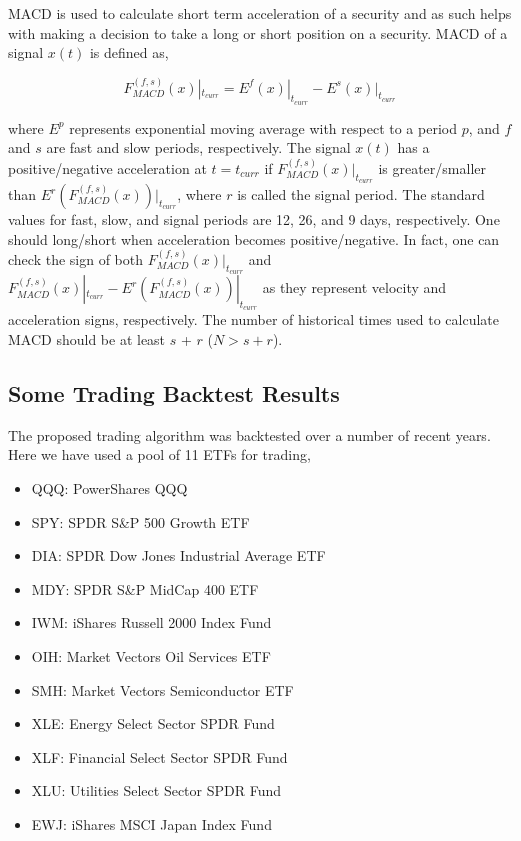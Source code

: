\documentclass{article}
\begin{document}
MACD is used to calculate short term acceleration of a security and as
such helps with making a decision to take a long or short position on
a security. MACD of a signal $x(t)$ is defined as,

\begin{equation}\label{eqn:macd}
F_{MACD}^{(f,s)}(x)|_{t_{curr}} = E^{f}(x)|_{t_{curr}} -
E^{s}(x)|_{t_{curr}}
\end{equation}

where $E^{p}$ represents exponential moving average with respect to a
period $p$, and $f$ and $s$ are fast and slow periods,
respectively. The signal $x(t)$ has a positive/negative acceleration
at $t=t_{curr}$ if $F_{MACD}^{(f,s)}(x)|_{t_{curr}}$ is
greater/smaller than $E^{r}(F_{MACD}^{(f,s)}(x))|_{t_{curr}}$, where
$r$ is called the signal period. The standard values for fast, slow,
and signal periods are 12, 26, and 9 days, respectively. One should
long/short when acceleration becomes positive/negative. In fact, one
can check the sign of both $F_{MACD}^{(f,s)}(x)|_{t_{curr}}$ and
$F_{MACD}^{(f,s)}(x)|_{t_{curr}}-E^{r}(F_{MACD}^{(f,s)}(x))|_{t_{curr}}$
as they represent velocity and acceleration signs, respectively. The
number of historical times used to calculate MACD should be at least
$s$ + $r$ ($N > s + r$).

\subsection{Some Trading Backtest Results}\label{subsection:trading-backtest}

The proposed trading algorithm was backtested over a number of recent
years. Here we have used a pool of 11 ETFs for trading,

\begin{itemize}
    \item[] QQQ: PowerShares QQQ 
    \item[] SPY: SPDR S\&P 500 Growth ETF 
    \item[] DIA: SPDR Dow Jones Industrial Average ETF 
    \item[] MDY: SPDR S\&P MidCap 400 ETF 
    \item[] IWM: iShares Russell 2000 Index Fund 
    \item[] OIH: Market Vectors Oil Services ETF 
    \item[] SMH: Market Vectors Semiconductor ETF 
    \item[] XLE: Energy Select Sector SPDR Fund 
    \item[] XLF: Financial Select Sector SPDR Fund 
    \item[] XLU: Utilities Select Sector SPDR Fund 
    \item[] EWJ: iShares MSCI Japan Index Fund
\end{itemize}
\end{document}
